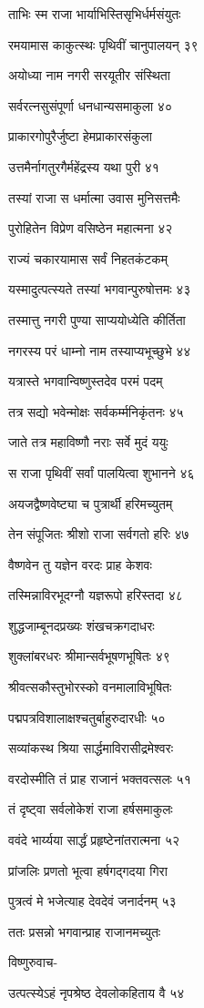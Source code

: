 ताभिः स्म राजा भार्याभिस्तिसृभिर्धर्मसंयुतः

रमयामास काकुत्स्थः पृथिवीं चानुपालयन् ३९

अयोध्या नाम नगरी सरयूतीर संस्थिता

सर्वरत्नसुसंपूर्णा धनधान्यसमाकुला ४०

प्राकारगोपुरैर्जुष्टा हेमप्राकारसंकुला

उत्तमैर्नागतुरगैर्महेंद्रस्य यथा पुरी ४१

तस्यां राजा स धर्मात्मा उवास मुनिसत्तमैः

पुरोहितेन विप्रेण वसिष्ठेन महात्मना ४२

राज्यं चकारयामास सर्वं निहतकंटकम्

यस्मादुत्पत्स्यते तस्यां भगवान्पुरुषोत्तमः ४३

तस्मात्तु नगरी पुण्या साप्ययोध्येति कीर्तिता

नगरस्य परं धाम्नो नाम तस्याप्यभूच्छुभे ४४

यत्रास्ते भगवान्विष्णुस्तदेव परमं पदम्

तत्र सद्यो भवेन्मोक्षः सर्वकर्म्मनिकृंतनः ४५

जाते तत्र महाविष्णौ नराः सर्वे मुदं ययुः

स राजा पृथिवीं सर्वां पालयित्वा शुभानने ४६

अयजद्वैष्णवेष्ट्या च पुत्रार्थी हरिमच्युतम्

तेन संपूजितः श्रीशो राजा सर्वगतो हरिः ४७

वैष्णवेन तु यज्ञेन वरदः प्राह केशवः

तस्मिन्नाविरभूदग्नौ यज्ञरूपो हरिस्तदा ४८

शुद्धजाम्बूनदप्रख्यः शंखचक्रगदाधरः

शुक्लांबरधरः श्रीमान्सर्वभूषणभूषितः ४९

श्रीवत्सकौस्तुभोरस्को वनमालाविभूषितः

पद्मपत्रविशालाक्षश्चतुर्बाहुरुदारधीः ५०

सव्यांकस्थ श्रिया सार्द्धमाविरासीद्रमेश्वरः

वरदोस्मीति तं प्राह राजानं भक्तवत्सलः ५१

तं दृष्ट्वा सर्वलोकेशं राजा हर्षसमाकुलः

ववंदे भार्य्यया सार्द्धं प्रहृष्टेनांतरात्मना ५२

प्रांजलिः प्रणतो भूत्वा हर्षगद्गदया गिरा

पुत्रत्वं मे भजेत्याह देवदेवं जनार्दनम् ५३

ततः प्रसन्नो भगवान्प्राह राजानमच्युतः

विष्णुरुवाच-

उत्पत्स्येऽहं नृपश्रेष्ठ देवलोकहिताय वै ५४

